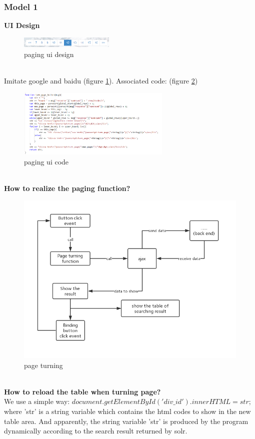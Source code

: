 \documentclass{article}
\begin{document}
	\subsubsection{Model 1}
	\textbf{UI Design}
	\begin{figure}[htb]
		\centering
		\includegraphics[width=0.4\textwidth]{paging-ui.png}
		\caption{paging ui design}\label{paging-ui}
	\end{figure}\\
	Imitate google and baidu (figure \ref{paging-ui}).   Associated code: (figure \ref{paging-code})
	\begin{figure}[!h]
		\centering
		\includegraphics[width=0.65\textwidth]{paging-code.png}
		\caption{paging ui code}\label{paging-code}
	\end{figure}\\
	\textbf{How to realize the paging function?}
	\begin{figure}[htb]
		\centering
		\includegraphics[width=1.0\textwidth]{paging-process.png}
		\caption{page turning}\label{paging-process}
	\end{figure}\\
	\textbf{How to reload the table when turning page?}\\
	We use a simple way: $document.getElementById('div\_id').innerHTML=str;$ where 'str' is a string variable which contains the html codes to show in the new table area. And apparently, the string variable 'str' is produced by the program dynamically according to the search result returned by solr.\\
	
\end{document}
